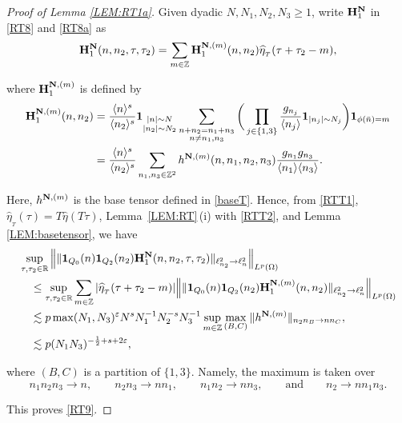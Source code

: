 \documentclass[%
11pt,  reqno]{amsart}
\newcommand{\1}{\hspace{0.2mm}\text{I}\hspace{0.2mm}}
\newcommand{\noi}{\noindent}
\newcommand{\Z}{\mathbb{Z}}
\newcommand{\R}{\mathbb{R}}
\newcommand{\eps}{\varepsilon}
\newcommand{\ft}{\widehat}
\renewcommand{\l}{\ell}
\renewcommand{\O}{\Omega}
\newcommand{\les}{\lesssim}
\newcommand{\jb}[1]
{\langle #1 \rangle}
\newcommand{\ind}{\mathbf 1}
\numberwithin{equation}{section}
\numberwithin{theorem}{section}
\newcommand{\Hb}{\mathbf{H}}
\begin{document}
\begin{proof}[Proof of Lemma \ref{LEM:RT1a}]


Given dyadic $N, N_1, N_2, N_3 \ge 1$, write $\Hb_1^{\bf N}$
in \eqref{RT8} and \eqref{RT8a} 
as 
\begin{align}
\Hb_1^{\bf N}
 (n,n_2,\tau, \tau_2)  
= \sum_{m \in \Z} \Hb^{{\bf N}, (m)}_1 (n, n_2 )\ft \eta_{_T} (\tau + \tau_2 - m),   
\label{RTT1}
\end{align}


\noi
where $\Hb^{{\bf N}, (m)}_1$ is defined by 
\begin{align}
\begin{split}
 \Hb^{{\bf N}, (m)}_1 (n, n_2)
& =  \frac{\jb{n}^{s}}{ \jb{n_2}^{s}} 
\ind_{\substack{|n| \sim N\\|n_2|\sim N_2}}
\sum_{\substack{n + n_2 = n_1 + n_3\\ n \neq n_1,n_3}} 
\bigg(\prod_{j \in \{ 1, 3\}}
\frac{g_{n_j} }{\jb{n_j}}
\ind_{|n_j|\sim N_j}\bigg)
\ind_{ \phi (\bar n) = m}\\
& =  \frac{\jb{n}^{s}}{ \jb{n_2}^{s}} 
\sum_{n_1, n_3 \in \Z^2} 
h^{{\bf N}, (m)}(n, n_1, n_2, n_3)
\frac{g_{n_1} g_{n_3}}{\jb{n_1}\jb{n_3}}.
\end{split}
\label{RTT2}
\end{align}


\noi
Here,  $h^{{\bf N}, (m)}$ is the base tensor defined in \eqref{baseT}. 
Hence, from \eqref{RTT1}, 
$\ft \eta_{_T}(\tau) = T \ft \eta (T\tau)$, 
Lemma~\ref{LEM:RT}\,(i) with \eqref{RTT2}, and Lemma \ref{LEM:basetensor}, we have
\[
\begin{split} 
& \sup_{\tau,\tau_2\in \R} \Big\|  \| 
 \ind_{Q_0} (n) \ind_{Q_2} (n_2)
\Hb_1^{\bf N} (n,n_2,\tau,\tau_2) \|_{\l^2_{n_2} \to \l^2_n} \Big\|_{L^p(\O)} \\
& \quad \le \sup_{\tau,\tau_2\in \R} \sum_{m \in \Z}
|\ft \eta_{_T} (\tau + \tau_2 - m)| 
\Big\| \|   \ind_{Q_0} (n) \ind_{Q_2} (n_2) \Hb_1^{{\bf N}, (m)} (n,n_2) 
\|_{\l^2_{n_2} \to \l^2_n} \Big\|_{L^p(\O)}  \\
&\quad \les p  \max(N_1, N_3)^\eps N^s N_1^{-1}N_2^{-s}  N_3^{-1} 
\sup_{m \in \Z}
\max_{(B, C)}  \|  h^{{\bf N}, (m)}  \|_{n_2 n_B  \to n n_C},  \\
& \quad \les p 
 (N_1N_3)^{-\frac12 + s+  2\eps}, 
\end{split}
\]


\noi
where 
$(B, C)$ is a partition of $\{1, 3\}$.
Namely, the maximum is taken over 
\[n_1 n_2 n_3  \to n , \qquad  
n_2 n_3 \to n n_1, 
\qquad n_1 n_2 \to nn_3, 
\qquad \text{and}\qquad 
n_2 \to nn_1 n_3. \]


\noi
This proves  \eqref{RT9}.
\end{proof}
\end{document}
